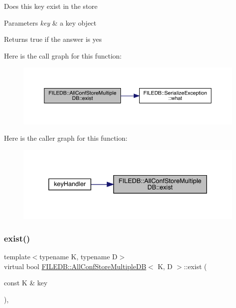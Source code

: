 Does this key exist in the store 
\begin{DoxyParams}{Parameters}
{\em key} & a key object \\
\hline
\end{DoxyParams}
\begin{DoxyReturn}{Returns}
true if the answer is yes 
\end{DoxyReturn}
Here is the call graph for this function\+:
\nopagebreak
\begin{figure}[H]
\begin{center}
\leavevmode
\includegraphics[width=350pt]{d5/dbe/classFILEDB_1_1AllConfStoreMultipleDB_a5c9333af45c37c53c863ad2a07a9843b_cgraph}
\end{center}
\end{figure}
Here is the caller graph for this function\+:\nopagebreak
\begin{figure}[H]
\begin{center}
\leavevmode
\includegraphics[width=330pt]{d5/dbe/classFILEDB_1_1AllConfStoreMultipleDB_a5c9333af45c37c53c863ad2a07a9843b_icgraph}
\end{center}
\end{figure}
\mbox{\label{classFILEDB_1_1AllConfStoreMultipleDB_a5c9333af45c37c53c863ad2a07a9843b}} 
\subsubsection{\texorpdfstring{exist()}{exist()}\hspace{0.1cm}{\footnotesize\ttfamily [2/2]}}
{\footnotesize\ttfamily template$<$typename K, typename D$>$ \\
virtual bool \mbox{\hyperlink{classFILEDB_1_1AllConfStoreMultipleDB}{F\+I\+L\+E\+D\+B\+::\+All\+Conf\+Store\+Multiple\+DB}}$<$ K, D $>$\+::exist (\begin{DoxyParamCaption}\item[{const K \&}]{key }\end{DoxyParamCaption})\hspace{0.3cm}{\ttfamily [inline]}, {\ttfamily [virtual]}}

